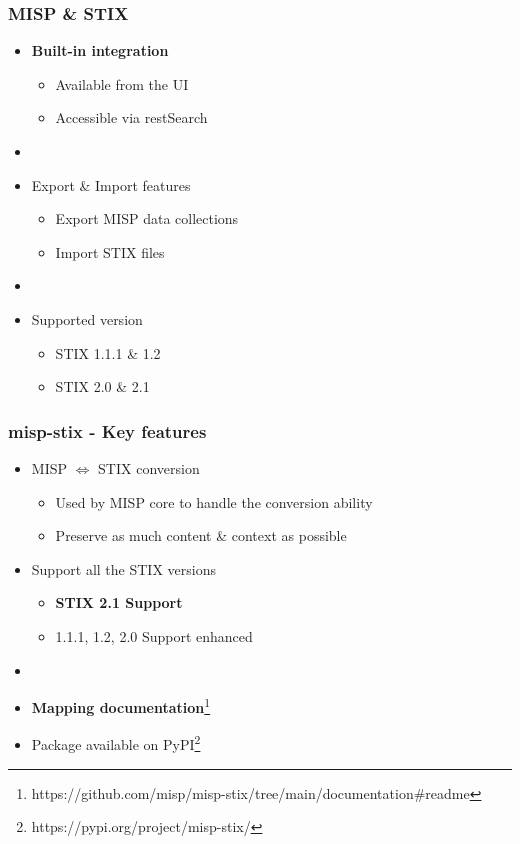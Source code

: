 
\begin{frame}[t,plain]
\titlepage
\end{frame}

\begin{frame}
    \frametitle{MISP \& STIX}
    \begin{itemize}
        \item \textbf{Built-in integration}
        \begin{itemize}
            \item Available from the UI
            \item Accessible via restSearch
        \end{itemize}
        \item []
        \item Export \& Import features
        \begin{itemize}
            \item Export MISP data collections
            \item Import STIX files
        \end{itemize}
        \item []
        \item Supported version
        \begin{itemize}
            \item STIX 1.1.1 \& 1.2
            \item STIX 2.0 \& 2.1
        \end{itemize}
    \end{itemize}
\end{frame}

\begin{frame}
    \frametitle{misp-stix - Key features}
    \begin{itemize}
        \item MISP $\Longleftrightarrow$ STIX conversion
        \begin{itemize}
            \item Used by MISP core to handle the conversion ability
            \item Preserve as much content \& context as possible
        \end{itemize}
        \item Support all the STIX versions
        \begin{itemize}
            \item \textbf{STIX 2.1 Support}
            \item 1.1.1, 1.2, 2.0 Support enhanced
        \end{itemize}
        \item []
        \item \textbf{Mapping documentation}\footnote{https://github.com/misp/misp-stix/tree/main/documentation\#readme}
        \item Package available on PyPI\footnote{https://pypi.org/project/misp-stix/}
    \end{itemize}
\end{frame}

